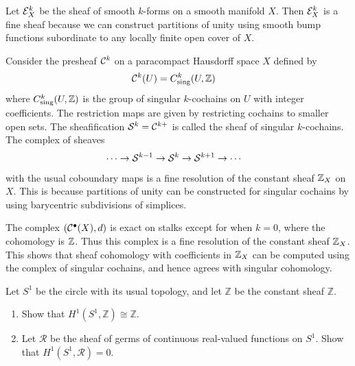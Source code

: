 \documentclass[12pt]{article}
\begin{document}
\begin{example}
    Let ${\mathcal{E}}^k_X$ be the sheaf of smooth $k$-forms on a smooth manifold $X$. Then ${\mathcal{E}}^k_X$ is a fine sheaf because we can construct partitions of unity using smooth bump functions subordinate to any locally finite open cover of $X$.
\end{example}

\begin{example}
    Consider the presheaf ${\mathcal{C}}^k$ on a paracompact Hausdorff space $X$ defined by \begin{align*}
        {\mathcal{C}}^k(U) & = C^k_{\text{sing}}(U, \mathbb{Z})
    \end{align*} where $C^k_{\text{sing}}(U, \mathbb{Z})$ is the group of singular $k$-cochains on $U$ with integer coefficients. The restriction maps are given by restricting cochains to smaller open sets. The sheafification ${\mathcal{S}}^k = {\mathcal{C}}^{k+}$ is called the sheaf of singular $k$-cochains. The complex of sheaves \begin{align*}
        \cdots \to {\mathcal{S}}^{k-1} & \to {\mathcal{S}}^k \to {\mathcal{S}}^{k+1} \to \cdots
    \end{align*} with the usual coboundary maps is a fine resolution of the constant sheaf $\mathbb{Z}_X$ on $X$. This is because partitions of unity can be constructed for singular cochains by using barycentric subdivisions of simplices.

    The complex $({\mathcal{C}}^\bullet(X), d)$ is exact on stalks except for when $k=0$, where the cohomology is $\mathbb{Z}$. Thus this complex is a fine resolution of the constant sheaf $\mathbb{Z}_X$. This shows that sheaf cohomology with coefficients in $\mathbb{Z}_X$ can be computed using the complex of singular cochains, and hence agrees with singular cohomology.
\end{example}

\begin{exercise}
    Let $S^1$ be the circle with its usual topology, and let $\mathbb Z$ be the constant sheaf $\mathbb Z$.
    \begin{enumerate}
        \item Show that $H^1(S^1,\mathbb Z)\cong \mathbb Z$.
        \item Let $\mathcal R$ be the sheaf of germs of continuous real-valued functions on $S^1$. Show that $H^1(S^1,\mathcal R)=0$.
    \end{enumerate}
\end{exercise}
\end{document}

